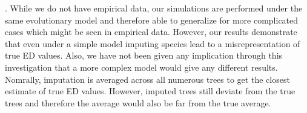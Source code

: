 \documentclass[12pt,english]{article}
\begin{document}
 .
While we do not have empirical data, our simulations are performed
under the same evolutionary model and therefore able to generalize for
more complicated cases which might be seen in empirical data.
However, our results demonstrate that even under a simple model
imputing species lead to a misrepresentation of true ED values.  Also,
we have not been given any implication through this investigation that
a more complex model would give any different results.
Nomrally, imputation is averaged across all numerous trees to get the
closest estimate of true ED values. However, imputed trees still
deviate from the true trees and therefore the average would also be
far from the true average.

\end{document}
